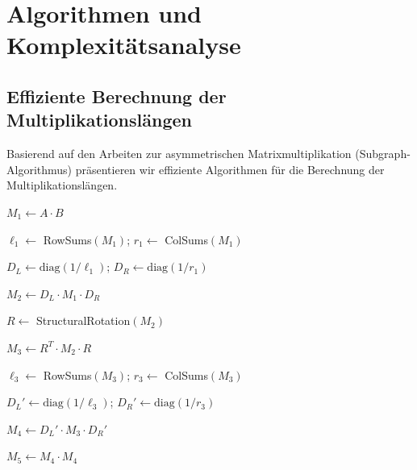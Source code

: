 \documentclass[a4paper,12pt]{article}
\theoremstyle{definition}
\begin{document}
\section{Algorithmen und Komplexitätsanalyse}

\subsection{Effiziente Berechnung der Multiplikationslängen}

Basierend auf den Arbeiten zur asymmetrischen Matrixmultiplikation (Subgraph-Algorithmus) präsentieren wir effiziente Algorithmen für die Berechnung der Multiplikationslängen.

\begin{algorithm}
\caption{Berechnung der Multiplikationslängen (MLM-Algorithmus)}
\label{alg:mlm}
\begin{algorithmic}[1]

\State $M_1 \leftarrow A \cdot B$ 

\State $\ell_1 \leftarrow$ RowSums$(M_1)$; $r_1 \leftarrow$ ColSums$(M_1)$ 

\State $D_L \leftarrow \mathrm{diag}(1/\ell_1)$; $D_R \leftarrow \mathrm{diag}(1/r_1)$ 

\State $M_2 \leftarrow D_L \cdot M_1 \cdot D_R$ 

\State $R \leftarrow$ StructuralRotation$(M_2)$ 

\State $M_3 \leftarrow R^T \cdot M_2 \cdot R$ 

\State $\ell_3 \leftarrow$ RowSums$(M_3)$; $r_3 \leftarrow$ ColSums$(M_3)$ 

\State $D_L' \leftarrow \mathrm{diag}(1/\ell_3)$; $D_R' \leftarrow \mathrm{diag}(1/r_3)$

\State $M_4 \leftarrow D_L' \cdot M_3 \cdot D_R'$ 

\State $M_5 \leftarrow M_4 \cdot M_4$ 

\State {}
\end{algorithmic}
\end{algorithm}
\end{document}
